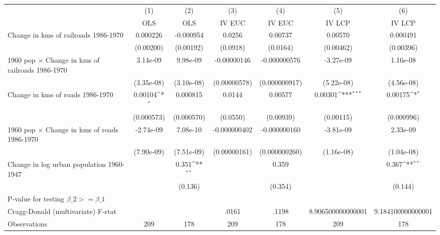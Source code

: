 {
\def\sym#1{\ifmmode^{#1}\else\(^{#1}\)\fi}
\begin{tabular}{l*{6}{c}}
\hline\hline
                &\multicolumn{1}{c}{(1)}&\multicolumn{1}{c}{(2)}&\multicolumn{1}{c}{(3)}&\multicolumn{1}{c}{(4)}&\multicolumn{1}{c}{(5)}&\multicolumn{1}{c}{(6)}\\
                &\multicolumn{1}{c}{OLS}&\multicolumn{1}{c}{OLS}&\multicolumn{1}{c}{IV EUC}&\multicolumn{1}{c}{IV EUC}&\multicolumn{1}{c}{IV LCP}&\multicolumn{1}{c}{IV LCP}\\
\hline
Change in kms of railroads 1986-1970& 0.000226         &-0.000954         &   0.0256         &  0.00737         &  0.00570         & 0.000491         \\
                &(0.00200)         &(0.00192)         & (0.0918)         & (0.0164)         &(0.00462)         &(0.00396)         \\
[1em]
1960 pop $\times$ Change in kms of railroads 1986-1970& 3.14e-09         & 9.98e-09         &-0.00000146         &-0.000000576         &-3.27e-09         & 1.16e-08         \\
                &(3.35e-08)         &(3.10e-08)         &(0.00000578)         &(0.000000917)         &(5.22e-08)         &(4.56e-08)         \\
[1em]
Change in kms of roads 1986-1970&  0.00104\sym{*}  & 0.000815         &   0.0144         &  0.00577         &  0.00301\sym{***}&  0.00175\sym{*}  \\
                &(0.000573)         &(0.000570)         & (0.0550)         &(0.00939)         &(0.00115)         &(0.000996)         \\
[1em]
1960 pop $\times$ Change in kms of roads 1986-1970&-2.74e-09         & 7.08e-10         &-0.000000402         &-0.000000160         &-3.81e-09         & 2.33e-09         \\
                &(7.90e-09)         &(7.51e-09)         &(0.00000161)         &(0.000000260)         &(1.16e-08)         &(1.04e-08)         \\
[1em]
Change in log urban population 1960-1947&                  &    0.351\sym{**} &                  &    0.359         &                  &    0.367\sym{**} \\
                &                  &  (0.136)         &                  &  (0.354)         &                  &  (0.144)         \\
\hline
P-value for testing $\beta\_{2} >= \beta\_{1}$&                  &                  &                  &                  &                  &                  \\
Cragg-Donald (multivariate) F-stat&                  &                  &    .0161         &    .1198         &8.906500000000001         &9.184100000000001         \\
Observations    &      209         &      178         &      209         &      178         &      209         &      178         \\
\hline\hline
\end{tabular}
}

